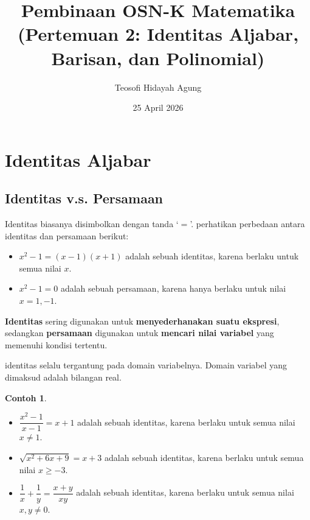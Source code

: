 \documentclass[aspectratio=169]{beamer}
\date{25 April 2026}
\title[OSK Matematika - Aljabar]{Pembinaan OSN-K Matematika\\(Pertemuan 2: Identitas Aljabar, Barisan, dan Polinomial)}
\author[Tetew]{Teosofi Hidayah Agung}
\institute[MAN 1 Pasuruan]{MAN 1 Pasuruan}
\theoremstyle{definition}
\newtheorem{contoh}{Contoh}
\begin{document}
\begin{frame}
  \titlepage
\end{frame}

\section{Identitas Aljabar}
\subsection{Identitas v.s. Persamaan}
\begin{frame}{\insertsection}{\insertsubsection}
  Identitas biasanya disimbolkan dengan tanda `$=$'. perhatikan perbedaan antara identitas dan persamaan berikut:
  \begin{itemize}
    \item $x^2 - 1 = (x-1)(x+1)$ adalah sebuah identitas, karena berlaku untuk semua nilai $x$.
    \item $x^2 - 1 = 0$ adalah sebuah persamaan, karena hanya berlaku untuk nilai $x=1,-1$.
  \end{itemize}
  \textbf{Identitas} sering digunakan untuk \textbf{menyederhanakan suatu ekspresi}, sedangkan \textbf{persamaan} digunakan untuk \textbf{mencari nilai variabel} yang memenuhi kondisi tertentu.
\end{frame}

\begin{frame}{\insertsection}{\insertsubsection}
  identitas selalu tergantung pada domain variabelnya. Domain variabel yang dimaksud adalah bilangan real.
  \begin{contoh}
    \begin{itemize}
      \item $\dfrac{x^2-1}{x-1} = x+1$ adalah sebuah identitas, karena berlaku untuk semua nilai $x \neq 1$.
      \item $\sqrt{x^2+6x+9} = x+3$ adalah sebuah identitas, karena berlaku untuk semua nilai $x \geq -3$.
      \item $\dfrac{1}{x} + \dfrac{1}{y} = \dfrac{x+y}{xy}$ adalah sebuah identitas, karena berlaku untuk semua nilai $x,y \neq 0$.
    \end{itemize}
  \end{contoh}
\end{frame}
\end{document}
